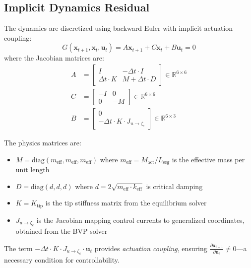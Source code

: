 \documentclass[conference]{IEEEtran}
\begin{document}
\subsection{Implicit Dynamics Residual}

The dynamics are discretized using backward Euler with implicit actuation coupling:
\begin{equation}
G(\mathbf{x}_{t+1}, \mathbf{x}_t, \mathbf{u}_t) = A \mathbf{x}_{t+1} + C \mathbf{x}_t + B \mathbf{u}_t = 0
\end{equation}
where the Jacobian matrices are:
\begin{align}
A &= \begin{bmatrix} I & -\Delta t \cdot I \\ \Delta t \cdot K & M + \Delta t \cdot D \end{bmatrix} \in \mathbb{R}^{6 \times 6} \\
C &= \begin{bmatrix} -I & 0 \\ 0 & -M \end{bmatrix} \in \mathbb{R}^{6 \times 6} \\
B &= \begin{bmatrix} 0 \\ -\Delta t \cdot K \cdot J_{u \rightarrow \zeta_c} \end{bmatrix} \in \mathbb{R}^{6 \times 3}
\end{align}

The physics matrices are:
\begin{itemize}
\item $M = \text{diag}(m_{\text{eff}}, m_{\text{eff}}, m_{\text{eff}})$ where $m_{\text{eff}} = M_{\text{act}} / L_{\text{seg}}$ is the effective mass per unit length
\item $D = \text{diag}(d, d, d)$ where $d = 2\sqrt{m_{\text{eff}} \cdot k_{\text{eff}}}$ is critical damping
\item $K = K_{\text{tip}}$ is the tip stiffness matrix from the equilibrium solver
\item $J_{u \rightarrow \zeta_c}$ is the Jacobian mapping control currents to generalized coordinates, obtained from the BVP solver
\end{itemize}

The term $-\Delta t \cdot K \cdot J_{u \rightarrow \zeta_c} \cdot \mathbf{u}_t$ provides \emph{actuation coupling}, ensuring $\frac{\partial \mathbf{x}_{t+1}}{\partial \mathbf{u}_t} \neq 0$---a necessary condition for controllability.
\end{document}
